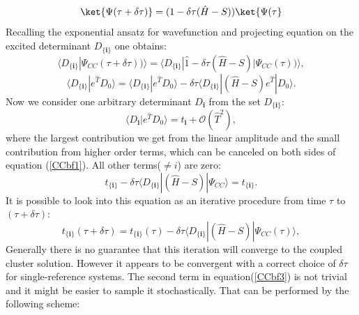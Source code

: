 \documentclass[twoside,english]{uiofysmaster}
\begin{document}
\begin{equation}
\ket{\Psi(\tau + \delta \tau)} = (1- \delta \tau(\hat{H}-S)) \ket{\Psi(\tau}
\end{equation}
Recalling the exponential ansatz for wavefunction and projecting
equation on the excited determinant $D_{\{\boldsymbol{i}\}}$ one
obtains:
\begin{equation}
\langle D_{\{\boldsymbol{i}\}}|\Psi_{CC}(\tau + \delta \tau))\rangle = \langle D_{\{\boldsymbol{i}\}}|\hat{1} - \delta \tau (\hat{H}-S)|\Psi_{CC}(\tau))\rangle,
\end{equation}
\begin{equation}\label{CCbf1}
\langle D_{\{\boldsymbol{i}\}}|e^{\hat{T}}D_0\rangle = \langle D_{\{\boldsymbol{i}\}}|e^{\hat{T}}D_0\rangle - \delta \tau \langle D_{\{\boldsymbol{i}\}}|(\hat{H}-S)e^{\hat{T}}|D_0\rangle.
\end{equation}
Now we consider one arbitrary determinant $D_{\boldsymbol{i}}$ from the set $D_{\{\boldsymbol{i}\}}$:
\begin{equation}
\langle D_{\boldsymbol{i}}|e^{\hat{T}}D_0\rangle = t_{\boldsymbol{i}} + \mathcal{O}(\hat{T}^2),
\end{equation}
where the largest contribution we get from the linear amplitude and
the small contribution from higher order terms, which can be canceled
on both sides of equation (\ref{CCbf1}). All other terms($\neq i$) are
zero:
\begin{equation}\label{CCbf2}
t_{\{\boldsymbol{i}\}} - \delta \tau \langle D_{\{\boldsymbol{i}\}}|(\hat{H}-S)|\Psi_{CC}\rangle = t_{\{\boldsymbol{i}\}}.
\end{equation}
It is possible to look into this equation as an iterative procedure from time $\tau$ to $(\tau + \delta \tau)$: 
\begin{equation}\label{CCbf3}
t_{\{\boldsymbol{i}\}}(\tau + \delta \tau) = t_{\{\boldsymbol{i}\}}(\tau) - \delta \tau \langle D_{\{\boldsymbol{i}\}}|(\hat{H}-S)|\Psi_{CC}(\tau)\rangle,
\end{equation}
Generally there is no guarantee that this iteration will converge to
the coupled cluster solution. However it appears to be convergent with
a correct choice of $\delta \tau$ for single-reference
systems\cite{SpencerDevelopmentsstochasticcoupled2016}. The second
term in equation(\ref{CCbf3}) is not trivial and it might be easier to
sample it stochastically. That can be performed by the following
scheme:
\end{document}

